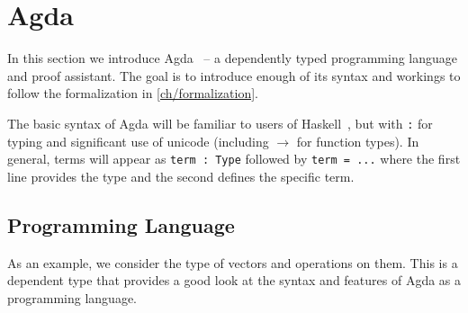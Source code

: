 \section{Agda}
In this section we introduce Agda~\cite{Agda} -- a dependently typed programming language
and proof assistant.
The goal is to introduce enough of its syntax and workings to follow the formalization in \autoref{ch/formalization}.

The basic syntax of Agda will be familiar to users of Haskell~\cite{haskell2010},
but with \texttt{:} for typing and significant use of unicode (including $\rightarrow$
for function types). In general, terms will appear as \texttt{term : Type} followed by
\texttt{term = ...} where the first line provides the type and the second defines the
specific term.

\subsection{Programming Language}

As an example, we consider the type of vectors and operations on them.
This is a dependent type that provides a good look at the syntax and features of
Agda as a programming language.

